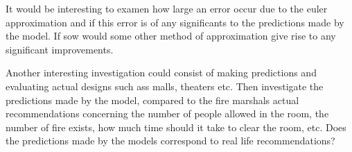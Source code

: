 It would be interesting to examen how large an error occur due to the euler approximation and if this error is of any significants to the predictions made by the model. If sow would some other method of approximation give rise to any significant improvements.

Another interesting investigation could consist of making predictions and evaluating actual designs such ass malls, theaters etc. Then investigate the predictions made by the model, compared to the fire marshals actual recommendations concerning the number of people allowed in the room, the number of fire exists, how much time should it take to clear the room, etc. Does the predictions made by the models correspond to real life recommendations?